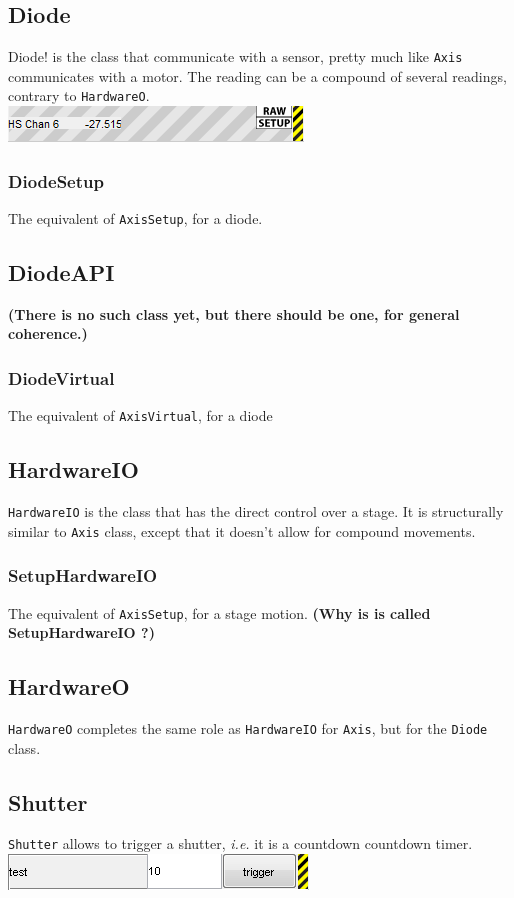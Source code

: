 \documentclass[10pt,letter,twoside]{report}
\newcommand{\temp}[1] {{\bf (#1)}}
\begin{document}
\subsection{Diode}
\!Diode! is the class that communicate with a sensor, pretty much like \verb!Axis! communicates with a motor.
The reading can be a compound of several readings, contrary to \verb!HardwareO!.\\
\includegraphics[scale=1]{img/met5gui-HardwareO.png}
\subsubsection{DiodeSetup}
The equivalent of \verb!AxisSetup!, for a diode.
\subsection{DiodeAPI}
\temp{There is no such class yet, but there should be one, for general coherence.}
\subsubsection{DiodeVirtual}
The equivalent of \verb!AxisVirtual!, for a diode

\subsection{HardwareIO}
\verb!HardwareIO! is the class that has the direct control over a stage.
It is structurally similar to \verb!Axis! class, except that it doesn't allow for compound movements.
\subsubsection{SetupHardwareIO}
The equivalent of \verb!AxisSetup!, for a stage motion.
\temp{Why is is called SetupHardwareIO ?}
\subsection{HardwareO}
\verb!HardwareO! completes the same role as \verb!HardwareIO! for \verb!Axis!, but for the \verb!Diode! class.

\subsection{Shutter}
\verb!Shutter! allows to trigger a shutter, \textit{i.e.} it is a countdown countdown timer.\\
\includegraphics[scale=1]{img/met5gui-Shutter.png}
\end{document}
